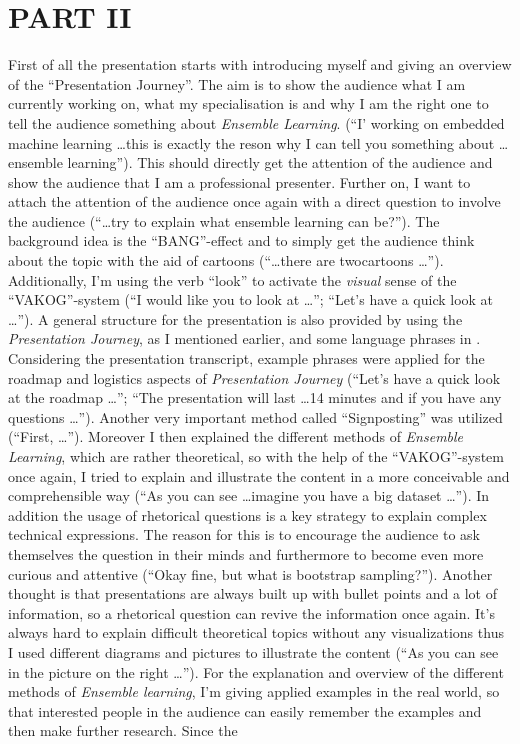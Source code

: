 \section{PART II}
First of all the presentation starts with introducing myself and giving an overview of the \enquote{Presentation Journey}\autocite[]{williams2008presentations}. The aim is to show the audience what I am currently working on, what my specialisation is and why I am the right one to tell the audience something about \textit{Ensemble Learning}. (\enquote{I' working on embedded machine learning \dots this is exactly the reson why I can tell you something about \dots ensemble learning}). This should directly get the attention of the audience and show the audience that I am a professional presenter. Further on, I want to attach the attention of the audience once again with a direct question to involve the audience (\enquote{\dots try to explain what ensemble learning can be?}). The background idea is the \enquote{BANG}-effect \autocite[]{bomberb} and  to simply get the audience think about the topic with the aid of cartoons (\enquote{\dots there are twocartoons \dots}). Additionally, I'm using the verb \enquote{look} to activate the \textit{visual} sense of the \enquote{VAKOG}-system (\enquote{I would like you to look at \dots}; \enquote{Let's have a quick look at \dots}). A general structure for the presentation is also provided by using the \textit{Presentation Journey}, as I mentioned earlier, and some language phrases in . Considering the presentation transcript, example phrases were applied for the roadmap and logistics aspects of \textit{Presentation Journey} (\enquote{Let's have a quick look at the roadmap \dots}; \enquote{The presentation will last \dots 14 minutes and if you have any questions \dots}). Another very important method called \enquote{Signposting} \autocite{williams2008presentations} was utilized (\enquote{First, \dots}). Moreover I then explained the different methods of \textit{Ensemble Learning}, which are rather theoretical, so with the help of the \enquote{VAKOG}-system \autocite{JumbuhPrabowo.2015} once again, I tried to explain and illustrate the content in a more conceivable and comprehensible way (\enquote{As you can see \dots imagine you have a big dataset \dots}). In addition the usage of rhetorical questions is a key strategy to explain complex technical expressions. The reason for this is to encourage the audience to ask themselves the question in their minds and furthermore to become even more curious and attentive (\enquote{Okay fine, but what is bootstrap sampling?}). Another thought is that presentations are always built up with bullet points and a lot of information, so a rhetorical question can revive the information once again. It's always hard to explain difficult theoretical topics without any visualizations thus I used different diagrams and pictures to illustrate the content (\enquote{As you can see in the picture on the right \dots}). For the explanation and overview of the different methods of \textit{Ensemble learning}, I'm giving applied examples in the real world, so that interested people in the audience can easily remember the examples and then make further research. Since the 